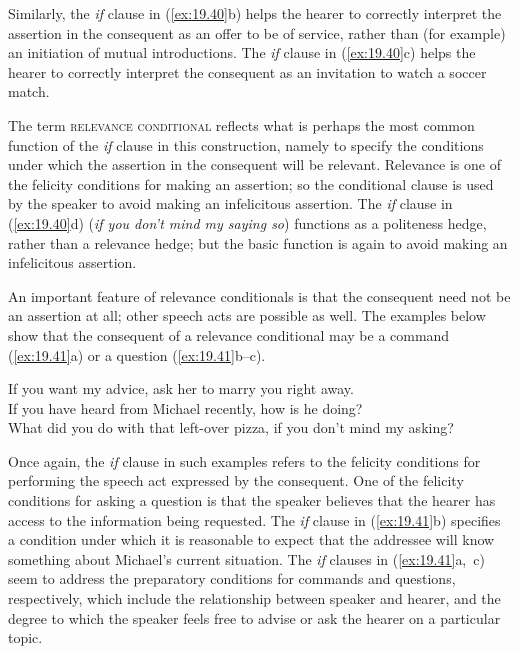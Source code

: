 Similarly, the \textit{if} clause in (\ref{ex:19.40}b) helps the hearer to correctly interpret the assertion in the consequent as an offer to be of service, rather than (for example) an initiation of mutual introductions. The \textit{if} clause in (\ref{ex:19.40}c) helps the hearer to correctly interpret the consequent as an invitation to watch a soccer match.



The term \textsc{relevance conditional} reflects what is perhaps the most common function of the \textit{if} clause in this construction, namely to specify the conditions under which the assertion in the consequent will be relevant. Relevance is one of the felicity conditions for making an assertion; so the conditional clause is used by the speaker to avoid making an infelicitous assertion. The \textit{if} clause in (\ref{ex:19.40}d) (\textit{if you don’t mind my saying so}) functions as a politeness hedge, rather than a relevance hedge; but the basic function is again to avoid making an infelicitous assertion.



An important feature of relevance conditionals is that the consequent need not be an assertion at all; other speech acts are possible as well. The examples below show that the consequent of a relevance conditional may be a command (\ref{ex:19.41}a) or a question (\ref{ex:19.41}b--c). 


\ea \label{ex:19.41}
\ea  If you want my advice, ask her to marry you right away.\\
\ex If you have heard from Michael recently, how is he doing?\\
\ex What did you do with that left-over pizza, if you don’t mind my asking?
                       \z
\z


Once again, the \textit{if} clause in such examples refers to the felicity conditions for performing the speech act expressed by the consequent. One of the felicity conditions for asking a question is that the speaker believes that the hearer has access to the information being requested. The \textit{if} clause in (\ref{ex:19.41}b) specifies a condition under which it is reasonable to expect that the addressee will know something about Michael’s current situation. The \textit{if} clauses in (\ref{ex:19.41}a,~c) seem to address the preparatory conditions for commands and questions, respectively, which include the relationship between speaker and hearer, and the degree to which the speaker feels free to advise or ask the hearer on a particular topic.



